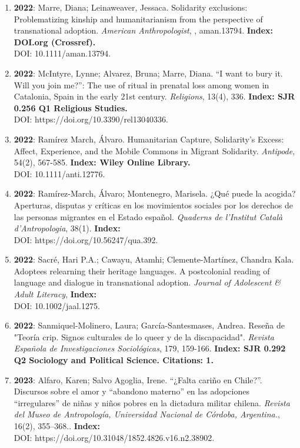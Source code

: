 \begin{enumerate}
\item {\bf 2022}: Marre, Diana; Leinaweaver, Jessaca.  Solidarity exclusions: Problematizing kinship and humanitarianism from the perspective of transnational adoption. {\it American Anthropologist}, , aman.13794. {\bf Index: DOI.org (Crossref). } \\ DOI: 10.1111/aman.13794. \filbreak
\item {\bf 2022}: McIntyre, Lynne; Alvarez, Bruna; Marre, Diana.  “I want to bury it. Will you join me?”: The use of ritual in prenatal loss among women in Catalonia, Spain in the early 21st century. {\it Religions}, 13(4), 336. {\bf Index: SJR 0.256 Q1 Religious Studies. } \\ DOI: https://doi.org/10.3390/rel13040336. \filbreak
\item {\bf 2022}: Ramírez March, Álvaro.  Humanitarian Capture, Solidarity’s Excess: Affect, Experience, and the Mobile Commons in Migrant Solidarity. {\it Antipode}, 54(2), 567-585. {\bf Index: Wiley Online Library. } \\ DOI: 10.1111/anti.12776. \filbreak
\item {\bf 2022}: Ramírez-March, Álvaro; Montenegro, Marisela.  ¿Qué puede la acogida? Aperturas, disputas y críticas en los movimientos sociales por los derechos de las personas migrantes en el Estado español. {\it Quaderns de l'Institut Català d'Antropologia}, 38(1). {\bf Index: } \\ DOI: https://doi.org/10.56247/qua.392. \filbreak
\item {\bf 2022}: Sacré, Hari P.A.; Cawayu, Atamhi; Clemente-Martínez, Chandra Kala.  Adoptees relearning their heritage languages. A postcolonial reading of language and dialogue in transnational adoption. {\it Journal of Adolescent \& Adult Literacy}, {\bf Index: } \\ DOI: 10.1002/jaal.1275. \filbreak
\item {\bf 2022}: Sanmiquel-Molinero, Laura; García-Santesmases, Andrea.  Reseña de "Teoría crip. Signos culturales de lo queer y de la discapacidad". {\it Revista Española de Investigaciones Sociológicas}, 179, 159-166. {\bf Index: SJR 0.292 Q2 Sociology and Political Science. Citations: 1. } \filbreak
\item {\bf 2023}: Alfaro, Karen; Salvo Agoglia, Irene.  “¿Falta cariño en Chile?”.  Discursos sobre el amor y “abandono materno” en las adopciones “irregulares” de niñas y niños pobres en la dictadura militar chilena. {\it Revista del Museo de Antropología, Universidad Nacional de Córdoba, Argentina.}, 16(2), 355–368.. {\bf Index: } \\ DOI: https://doi.org/10.31048/1852.4826.v16.n2.38902. \filbreak

\end{enumerate}
